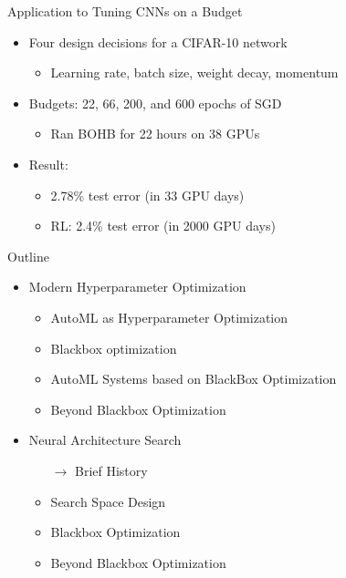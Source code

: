 \begin{frame}[c]{Application to Tuning CNNs on a Budget}
\begin{itemize}
	\item Four design decisions for a CIFAR-10 network
	\begin{itemize}
		\item Learning rate, batch size, weight decay, momentum
	\end{itemize}
	\item Budgets: 22, 66, 200, and 600 epochs of SGD
	\begin{itemize}
		\item Ran BOHB for 22 hours on 38 GPUs
	\end{itemize}
	\item Result:
	\begin{itemize}
		\item \alert{2.78\% test error} (in 33 GPU days)
		\item RL: \alert{2.4\% test error} (in 2000 GPU days)
	\end{itemize}
\end{itemize}
\end{frame}
\begin{frame}[c]{Outline}
\begin{itemize}
	\item Modern Hyperparameter Optimization
	\begin{itemize}
		\item AutoML as Hyperparameter Optimization
		\item Blackbox optimization
		\item AutoML Systems based on BlackBox Optimization
		\item Beyond Blackbox Optimization 
	\end{itemize}
	\item Neural Architecture Search
	\begin{itemize}
		\item[$\to$] Brief History
		\item Search Space Design
		\item Blackbox Optimization
		\item Beyond Blackbox Optimization
	\end{itemize}
\end{itemize}
\end{frame}
